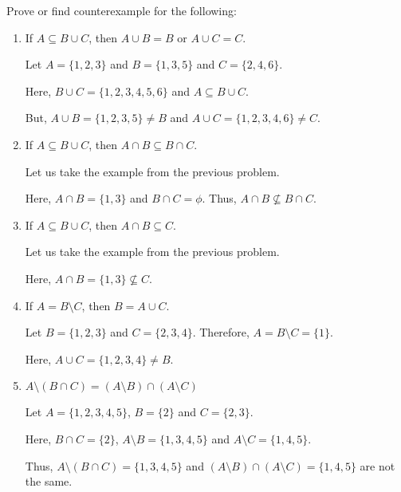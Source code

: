 \begin{problem}
	Prove or find counterexample for the following:
	\begin{enumerate}
		\item If $A \subseteq B \cup C$, then $A \cup B = B$ or $A \cup C = C$.
		
			\begin{solution}
				Let $A = \{1, 2, 3\}$ and $B = \{ 1, 3, 5 \}$ and $C = \{ 2, 4, 6 \}$.

				Here, $B \cup C = \{1, 2, 3, 4, 5, 6\}$ and $A \subseteq B \cup C$.

				But, $A \cup B = \{1, 2, 3, 5\} \neq B$ and $A \cup C = \{1, 2, 3, 4, 6\} \neq C$.
			\end{solution}
		
		\item If $A \subseteq B \cup C$, then $A \cap B \subseteq B \cap C$.
			\begin{solution}
				Let us take the example from the previous problem. 

				Here, $A \cap B = \{1, 3\}$ and $B \cap C = \phi$. Thus, $A \cap B \not\subseteq B \cap C$.
			\end{solution}

		\item If $A \subseteq B \cup C$, then $A \cap B \subseteq C$.
			\begin{solution}
				Let us take the example from the previous problem. 

				Here, $A \cap B = \{1, 3\} \not\subseteq C$.
			\end{solution}


		\item If $A = B \setminus C$, then $B = A \cup C$.
			\begin{solution}
				Let $B = \{1, 2, 3\}$ and $C = \{2, 3, 4\}$. Therefore, $A = B \setminus C = \{1\}$.

				Here, $A \cup C = \{1, 2, 3, 4\} \neq B$.
			\end{solution}


		\item $A \setminus (B \cap C) = (A \setminus B) \cap (A \setminus C)$
			\begin{solution}
				Let $A = \{1, 2, 3, 4, 5\}$, $B = \{2\}$ and $C = \{2, 3\}$.

				Here, $B \cap C = \{2\}$, $A \setminus B = \{1, 3, 4, 5\}$ and $A \setminus C = \{ 1, 4, 5 \}$.

				Thus, $A \setminus (B \cap C) = \{1, 3, 4, 5\}$ and $(A \setminus B) \cap (A \setminus C) = \{1, 4, 5\}$ are not the same.
			\end{solution}
			

\end{enumerate}
\end{problem}
